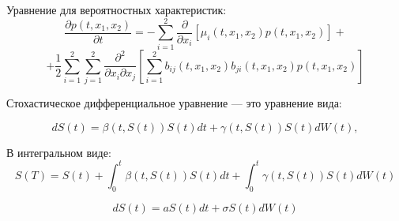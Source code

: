 \documentclass[notes,compress]{beamer}
\begin{document}
\begin{frame}
Уравнение для вероятностных характеристик:
    \[
      \frac{\partial p(t, x_1, x_2)}{\partial t} = - \sum_{i=1}^2 \frac{\partial}{\partial x_i} [\mu_i(t, x_1, x_2)p(t, x_1, x_2)] +
      \]
     \[
      + \frac{1}{2} \sum_{i=1}^2 \sum_{j=1}^2 \frac{\partial^2}{\partial x_i \partial x_j}\left[ \sum_{i=1}^2 b_{ij}(t, x_1, x_2)b_{ji}(t, x_1, x_2)p(t, x_1, x_2)\right]
    \]
\end{frame}

\begin{frame}
    Стохастическое дифференциальное уравнение --- это уравнение вида:

\[dS(t) = \beta(t, S(t)) S(t) dt + \gamma(t, S(t)) S(t) dW(t),\]


\end{frame}

\begin{frame}
В интегральном виде:
  \[S(T) = S(t) + \int_{0}^{t} \beta(t, S(t)) S(t) dt + \int_{0}^{t} \gamma(t, S(t)) S(t) dW(t)\]
\end{frame}

\begin{frame}
  \[dS(t) = aS(t)dt + \sigma S(t)dW(t)\]
\end{frame}

\begin{frame}

\end{frame}
\end{document}
